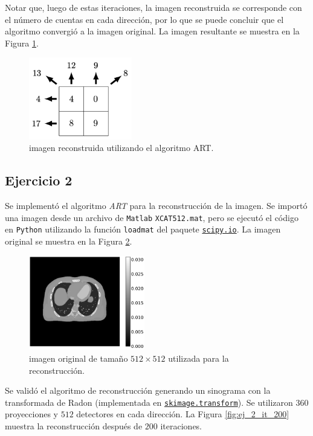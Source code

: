 \documentclass[11pt, twocolumn]{article}
\begin{document}
Notar que, luego de estas iteraciones, la imagen reconstruida se corresponde con el número de cuentas en cada dirección, por lo que se puede concluir que el algoritmo convergió a la imagen original. La imagen resultante se muestra en la Figura \ref{fig:ej_1_rec}.

\begin{figure}[htbp]
  \centering
  \includegraphics[width=0.4\textwidth]{images/ej_1/imagen_resconstruida_ej1.png}
  \caption{imagen reconstruida utilizando el algoritmo ART.}
  \label{fig:ej_1_rec}
\end{figure}

\subsection*{Ejercicio 2}
Se implementó el algoritmo \textit{ART} para la reconstrucción de la imagen. Se importó una imagen desde un archivo de \texttt{Matlab} \texttt{XCAT512.mat}, pero se ejecutó el código en \texttt{Python} utilizando la función \texttt{loadmat} del paquete \href{https://docs.scipy.org/doc/scipy/reference/io.html}{\texttt{scipy.io}}. La imagen original se muestra en la Figura \ref{fig:ej_2_orig}.

\begin{figure} [htbp]
  \centering
  \includegraphics[width=0.45\textwidth]{images/ej_2/original_ej_2.png}
  \caption{imagen original de tamaño $512\times512$ utilizada para la reconstrucción.}
  \label{fig:ej_2_orig}
\end{figure}

Se validó el algoritmo de reconstrucción generando un sinograma con la transformada de Radon (implementada en \href{https://scikit-image.org/docs/stable/api/skimage.transform.html#skimage.transform.radon}{\texttt{skimage.transform}}). Se utilizaron $360$ proyecciones y $512$ detectores en cada dirección. La Figura \ref{fig:ej_2_it_200} muestra la reconstrucción después de $200$ iteraciones.
\end{document}
